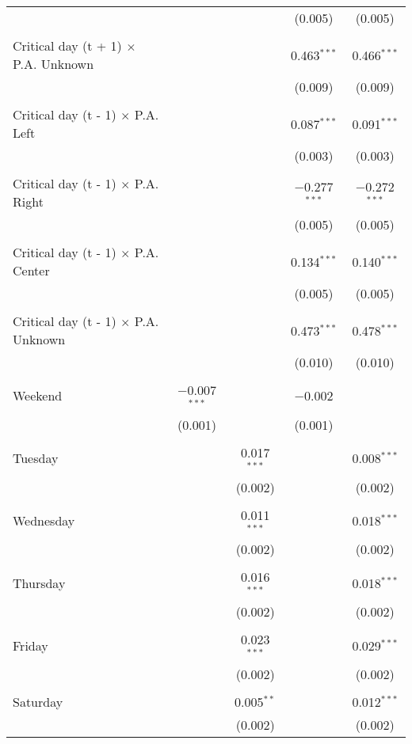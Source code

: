 \documentclass[
]{article}
\begin{document}
\begin{table}[!htbp]
{\begin{tabular}{@{\extracolsep{5pt}}lcccc}
  &  &  & (0.005) & (0.005) \\ 
  & & & & \\ 
 Critical day (t + 1) $\times$ P.A. Unknown &  &  & 0.463$^{***}$ & 0.466$^{***}$ \\ 
  &  &  & (0.009) & (0.009) \\ 
  & & & & \\ 
 Critical day (t - 1) $\times$ P.A. Left &  &  & 0.087$^{***}$ & 0.091$^{***}$ \\ 
  &  &  & (0.003) & (0.003) \\ 
  & & & & \\ 
 Critical day (t - 1) $\times$ P.A. Right &  &  & $-$0.277$^{***}$ & $-$0.272$^{***}$ \\ 
  &  &  & (0.005) & (0.005) \\ 
  & & & & \\ 
 Critical day (t - 1) $\times$ P.A. Center &  &  & 0.134$^{***}$ & 0.140$^{***}$ \\ 
  &  &  & (0.005) & (0.005) \\ 
  & & & & \\ 
 Critical day (t - 1) $\times$ P.A. Unknown &  &  & 0.473$^{***}$ & 0.478$^{***}$ \\ 
  &  &  & (0.010) & (0.010) \\ 
  & & & & \\ 
 Weekend & $-$0.007$^{***}$ &  & $-$0.002 &  \\ 
  & (0.001) &  & (0.001) &  \\ 
  & & & & \\ 
 Tuesday &  & 0.017$^{***}$ &  & 0.008$^{***}$ \\ 
  &  & (0.002) &  & (0.002) \\ 
  & & & & \\ 
 Wednesday &  & 0.011$^{***}$ &  & 0.018$^{***}$ \\ 
  &  & (0.002) &  & (0.002) \\ 
  & & & & \\ 
 Thursday &  & 0.016$^{***}$ &  & 0.018$^{***}$ \\ 
  &  & (0.002) &  & (0.002) \\ 
  & & & & \\ 
 Friday &  & 0.023$^{***}$ &  & 0.029$^{***}$ \\ 
  &  & (0.002) &  & (0.002) \\ 
  & & & & \\ 
 Saturday &  & 0.005$^{**}$ &  & 0.012$^{***}$ \\ 
  &  & (0.002) &  & (0.002) \\ 

\end{tabular}}
\end{table}
\end{document}
